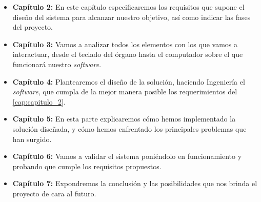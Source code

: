 \begin{itemize}

\item \textbf{Capítulo 2:} En este capítulo especificaremos los requisitos que supone el diseño del sistema para alcanzar nuestro objetivo, así como indicar las fases del proyecto.

\item \textbf{Capítulo 3:} Vamos a analizar todos los elementos con los que vamos a interactuar, desde el teclado del órgano hasta el computador sobre el que funcionará nuestro \textit{software}. 

\item \textbf{Capítulo 4:} Plantearemos el diseño de la solución, haciendo Ingeniería el \textit{software}, que cumpla de la mejor manera posible los requerimientos del \ref{cap:capitulo_2}.

\item \textbf{Capítulo 5:} En esta parte explicaremos cómo hemos implementado la solución diseñada, y cómo hemos enfrentado los principales problemas que han surgido.

\item \textbf{Capítulo 6:} Vamos a validar el sistema poniéndolo en funcionamiento y probando que cumple los requisitos propuestos.

\item \textbf{Capítulo 7:} Expondremos la conclusión y las posibilidades que nos brinda el proyecto de cara al futuro.
  
\end{itemize}

\newpage
\clearpage{\pagestyle{empty}\cleardoublepage}
